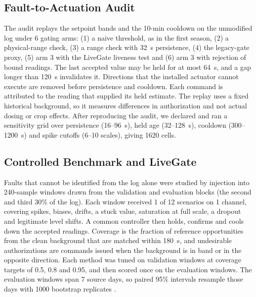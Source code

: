 \documentclass[preprint,12pt,doubleblind]{elsarticle}
\begin{document}
\subsection{Fault-to-Actuation Audit}
The audit replays the setpoint bands and the 10-min cooldown on the unmodified log under 6 gating arms: (1) a naive threshold, as in the first season, (2) a physical-range check, (3) a range check with 32~s persistence, (4) the legacy-gate proxy, (5) arm 3 with the LiveGate liveness test and (6) arm 3 with rejection of bound readings. The last accepted value may be held for at most 64~s, and a gap longer than 120~s invalidates it. Directions that the installed actuator cannot execute are removed before persistence and cooldown. Each command is attributed to the reading that supplied its held estimate. The replay uses a fixed historical background, so it measures differences in authorization and not actual dosing or crop effects. After reproducing the audit, we declared and ran a sensitivity grid over persistence (16--96~s), held age (32--128~s), cooldown (300--1200~s) and spike cutoffs (6--10 scales), giving 1620 cells.

\subsection{Controlled Benchmark and LiveGate}
\label{sec:livegate}
Faults that cannot be identified from the log alone were studied by injection into 240-sample windows drawn from the validation and evaluation blocks (the second and third 30\% of the log). Each window received 1 of 12 scenarios on 1 channel, covering spikes, biases, drifts, a stuck value, saturation at full scale, a dropout and legitimate level shifts. A common controller then holds, confirms and cools down the accepted readings. Coverage is the fraction of reference opportunities from the clean background that are matched within 180~s, and undesirable authorizations are commands issued when the background is in band or in the opposite direction. Each method was tuned on validation windows at coverage targets of 0.5, 0.8 and 0.95, and then scored once on the evaluation windows. The evaluation windows span 7 source days, so paired 95\% intervals resample those days with 1000 bootstrap replicates \cite{efron1979bootstrap}.
\end{document}
